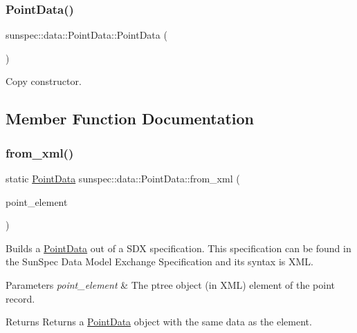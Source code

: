 \subsubsection{\texorpdfstring{Point\+Data()}{PointData()}\hspace{0.1cm}{\footnotesize\ttfamily [3/3]}}
{\footnotesize\ttfamily sunspec\+::data\+::\+Point\+Data\+::\+Point\+Data (\begin{DoxyParamCaption}\item[{const \hyperlink{structsunspec_1_1data_1_1_point_data}{Point\+Data} \&}]{ }\end{DoxyParamCaption})\hspace{0.3cm}{\ttfamily [default]}}

Copy constructor. 

\subsection{Member Function Documentation}
\mbox{\label{structsunspec_1_1data_1_1_point_data_a5cd5531342015e5f2a805e6c8ad75a0e}} 
\subsubsection{\texorpdfstring{from\+\_\+xml()}{from\_xml()}\hspace{0.1cm}{\footnotesize\ttfamily [1/2]}}
{\footnotesize\ttfamily static \hyperlink{structsunspec_1_1data_1_1_point_data}{Point\+Data} sunspec\+::data\+::\+Point\+Data\+::from\+\_\+xml (\begin{DoxyParamCaption}\item[{const boost\+::property\+\_\+tree\+::ptree \&}]{point\+\_\+element }\end{DoxyParamCaption})\hspace{0.3cm}{\ttfamily [static]}}

Builds a \hyperlink{structsunspec_1_1data_1_1_point_data}{Point\+Data} out of a S\+DX specification. This specification can be found in the Sun\+Spec Data Model Exchange Specification and its syntax is X\+ML. 
\begin{DoxyParams}{Parameters}
{\em point\+\_\+element} & The {\ttfamily ptree} object (in X\+ML) element of the point record. \\
\hline
\end{DoxyParams}
\begin{DoxyReturn}{Returns}
Returns a {\ttfamily \hyperlink{structsunspec_1_1data_1_1_point_data}{Point\+Data}} object with the same data as the element. 
\end{DoxyReturn}

